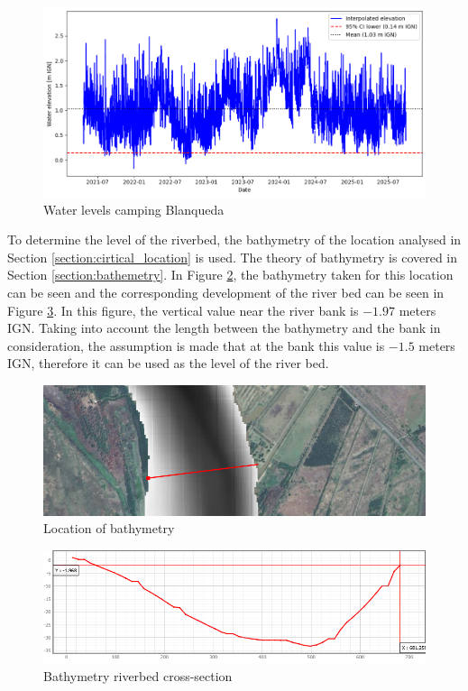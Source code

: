 \begin{figure}[H]
    \centering
    \includegraphics[width=0.55\linewidth]{figures/ch8/waterlevel_camping blanqueda.png}
    \caption{Water levels camping Blanqueda}
    \label{fig:water_levels_camping}
\end{figure}

To determine the level of the riverbed, the bathymetry of the location analysed in Section \ref{section:cirtical_location} is used. The theory of bathymetry is covered in Section \ref{section:bathemetry}. In Figure \ref{fig:bath}, the bathymetry taken for this location can be seen and the corresponding development of the river bed can be seen in Figure \ref{fig:bath2}. In this figure, the vertical value near the river bank is $-1.97$ meters IGN. Taking into account the length between the bathymetry and the bank in consideration, the assumption is made that at the bank this value is $-1.5$ meters IGN, therefore it can be used as the level of the river bed. 

\begin{figure}[H]
    \centering
    \includegraphics[width=0.65\linewidth]{figures/ch8/bathemetry_1.png}
    \caption{Location of bathymetry}
    \label{fig:bath}
\end{figure}

\begin{figure}[H]
    \centering
    \includegraphics[width=0.65\linewidth]{figures/ch8/bathemetry_2.png}
    \caption{Bathymetry riverbed cross-section}
    \label{fig:bath2}
\end{figure}

